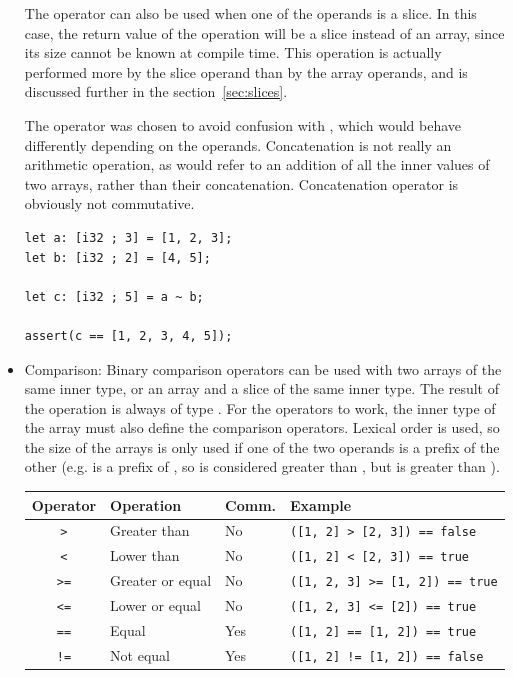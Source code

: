 \begin{itemize}
  The operator can also be used when one of the operands is a slice. In this
  case, the return value of the operation will be a slice instead of an array,
  since its size cannot be known at compile time. This operation is actually
  performed more by the slice operand than by the array operands, and is
  discussed further in the section~\ref{sec:slices}.

  The operator \token{\~} was chosen to avoid confusion with \token{+}, which
  would behave differently depending on the operands. Concatenation is not really
  an arithmetic operation, as \token{+} would refer to an addition of all the
  inner values of two arrays, rather than their concatenation. Concatenation
  operator is obviously not commutative.

  \begin{lstlisting}[style=coloredverbatim]
let a: [i32 ; 3] = [1, 2, 3];
let b: [i32 ; 2] = [4, 5];

let c: [i32 ; 5] = a ~ b;

assert(c == [1, 2, 3, 4, 5]);
  \end{lstlisting}

\item Comparison: Binary comparison operators can be used with two arrays of the
  same inner type, or an array and a slice of the same inner type. The result of
  the operation is always of type . For the operators to work, the
  inner type of the array must also define the comparison operators. Lexical
  order is used, so the size of the arrays is only used if one of the two operands
  is a prefix of the other (e.g. \token{[1, 2]} is a prefix of \token{[1, 2,
      3]}, so \token{[1, 2, 3]} is considered greater than \token{[1, 2]}, but
  \token{[1, 3]} is greater than \token{[1, 2, 3]}).

  \begin{center}\begin{adjustbox}{max width=1.0\linewidth}
    \begin{tabular}{|c|lll|}
      \hline
      Operator & Operation & Comm. & Example\\
      \hline
      \hline
      \texttt{>}      & Greater than     & No          & \texttt{([1, 2] > [2, 3]) == false}    \\
      \texttt{<}      & Lower than       & No          & \texttt{([1, 2] < [2, 3]) == true}     \\
      \texttt{>=}     & Greater or equal & No          & \texttt{([1, 2, 3] >= [1, 2]) == true} \\
      \texttt{<=}     & Lower or equal   & No          & \texttt{([1, 2, 3] <= [2]) == true}    \\
      \texttt{==}     & Equal            & Yes         & \texttt{([1, 2] == [1, 2]) == true}    \\
      \texttt{!=}     & Not equal        & Yes         & \texttt{([1, 2] != [1, 2]) == false}   \\
      \hline
    \end{tabular}
  \end{adjustbox}\end{center}


\end{itemize}
